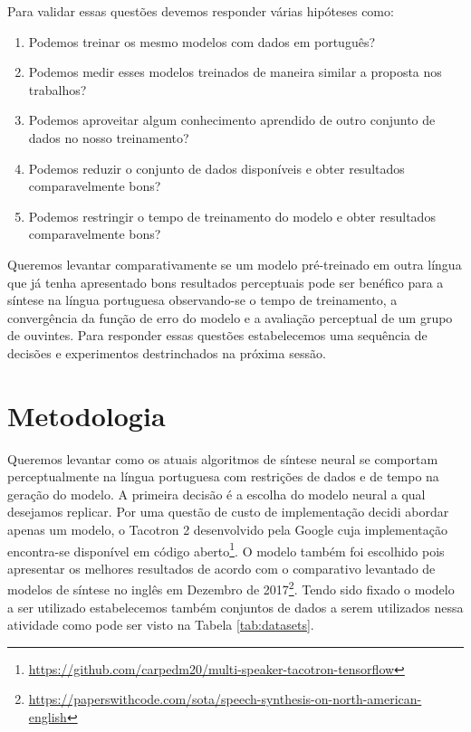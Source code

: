 \documentclass{article}
\begin{document}
Para validar essas questões devemos responder várias hipóteses como:

\begin{enumerate}
	\item \label{it:h1} Podemos treinar os mesmo modelos com dados em português?
	\item \label{it:h2} Podemos medir esses modelos treinados de maneira similar a proposta nos trabalhos?
	\item \label{it:h3} Podemos aproveitar algum conhecimento aprendido de outro conjunto de dados no nosso treinamento? 
	\item \label{it:h4} Podemos reduzir o conjunto de dados disponíveis e obter resultados comparavelmente bons?
	\item \label{it:h5} Podemos restringir o tempo de treinamento do modelo e obter resultados comparavelmente bons?
\end{enumerate}

Queremos levantar comparativamente se um modelo pré-treinado em outra língua que já tenha apresentado bons resultados perceptuais pode ser benéfico para a síntese na língua portuguesa observando-se o tempo de treinamento, a convergência da função de erro do modelo e a avaliação perceptual de um grupo de ouvintes.
Para responder essas questões estabelecemos uma sequência de decisões e experimentos destrinchados na próxima sessão.

\section{Metodologia}

Queremos levantar como os atuais algoritmos de síntese neural se comportam perceptualmente na língua portuguesa com restrições de dados e de tempo na geração do modelo. 
A primeira decisão é a escolha do modelo neural a qual desejamos replicar. 
Por uma questão de custo de implementação decidi abordar apenas um modelo, o Tacotron 2 \cite{tacotron2} desenvolvido pela Google cuja implementação encontra-se disponível em código aberto\footnote{\url{https://github.com/carpedm20/multi-speaker-tacotron-tensorflow}}.
O modelo também foi escolhido pois apresentar os melhores resultados de acordo com o comparativo levantado de modelos de síntese no inglês em Dezembro de 2017\footnote{\url{https://paperswithcode.com/sota/speech-synthesis-on-north-american-english}}.
Tendo sido fixado o modelo a ser utilizado estabelecemos também conjuntos de dados a serem utilizados nessa atividade como pode ser visto na Tabela \ref{tab:datasets}.
\end{document}

